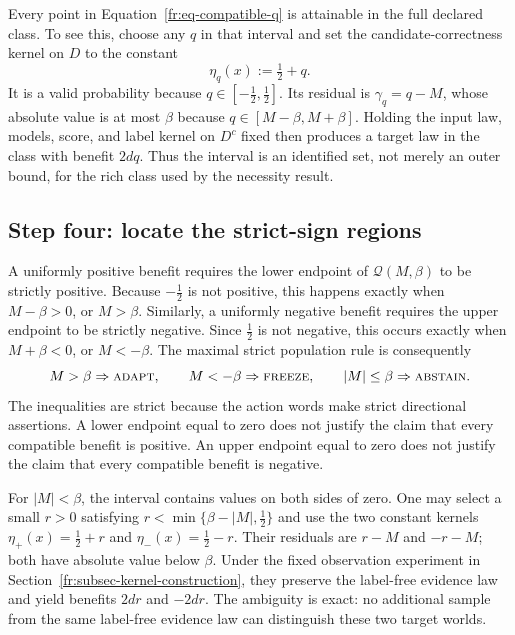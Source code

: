 Every point in Equation~\eqref{fr:eq-compatible-q} is attainable in the full declared class.  To
see this, choose any $q$ in that interval and set the candidate-correctness kernel on $D$ to the
constant
\begin{equation}
  \eta_q(x):=\tfrac12+q.
  \label{fr:eq-attaining-kernel}
\end{equation}
It is a valid probability because $q\in[-\tfrac12,\tfrac12]$.  Its residual is
$\gamma_q=q-M$, whose absolute value is at most $\beta$ because
$q\in[M-\beta,M+\beta]$.  Holding the input law, models, score, and label kernel on $D^c$ fixed
then produces a target law in the class with benefit $2dq$.  Thus the interval is an identified set,
not merely an outer bound, for the rich class used by the necessity result.

\subsection{Step four: locate the strict-sign regions}
\label{fr:subsec-strict-regions}

A uniformly positive benefit requires the lower endpoint of
$\mathcal Q(M,\beta)$ to be strictly positive.  Because $-\tfrac12$ is not positive, this happens
exactly when $M-\beta>0$, or $M>\beta$.  Similarly, a uniformly negative benefit requires the upper
endpoint to be strictly negative.  Since $\tfrac12$ is not negative, this occurs exactly when
$M+\beta<0$, or $M<-\beta$.  The maximal strict population rule is consequently
\begin{equation}
  M>\beta\Rightarrow\textnormal{\textsc{adapt}},
  \qquad
  M<-\beta\Rightarrow\textnormal{\textsc{freeze}},
  \qquad
  |M|\le\beta\Rightarrow\textnormal{\textsc{abstain}}.
  \label{fr:eq-population-rule}
\end{equation}
The inequalities are strict because the action words make strict directional assertions.  A lower
endpoint equal to zero does not justify the claim that every compatible benefit is positive.  An
upper endpoint equal to zero does not justify the claim that every compatible benefit is negative.

For $|M|<\beta$, the interval contains values on both sides of zero.  One may select a small
$r>0$ satisfying $r<\min\{\beta-|M|,\tfrac12\}$ and use the two constant kernels
$\eta_+(x)=\tfrac12+r$ and $\eta_-(x)=\tfrac12-r$.  Their residuals are $r-M$ and $-r-M$; both have
absolute value below $\beta$.  Under the fixed observation experiment in
Section~\ref{fr:subsec-kernel-construction}, they preserve the label-free evidence law and yield
benefits $2dr$ and $-2dr$.  The ambiguity is exact: no additional sample from the same label-free evidence law can
distinguish these two target worlds.

